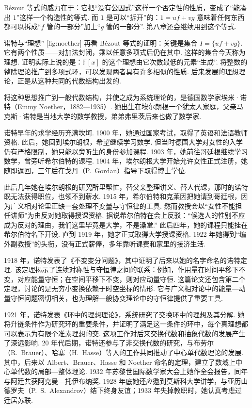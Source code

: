 \documentclass[lang=cn,10.5pt,scheme=chinese,toc=twocol,section,chinesefont=nofont,
twoside,citestyle=gb7714-2015,bibstyle=gb7714-2015]{elegantbook}
\DeclareRobustCommand{\textbf}[1]{{\lnsemiboldlatin\lnsemiboldcjk #1}}
\numberwithin{equation}{section}   %
\begin{document}
\begin{motivebox}
  Bézout 等式的威力在于：它把“没有公因式”这样一个\textbf{否定性}的性质，变成了“能凑出 $1$”这样一个\textbf{构造性}的等式. 而 $1$ 是可以“拆开”的：$1=uf+vg$ 意味着任何东西都可以拆成“$f$ 管的一部分”加上“$g$ 管的一部分”. 第八章还会继续用到这个等式.
\end{motivebox}
\begin{historybox}{诺特与“理想”}
  [fig:noether]
  再看 Bézout 等式的证明：关键是集合 $I=\{uf+vg\}$. 它有两个性质——对加法封闭，乘以任意多项式后仍在其中. 这样的集合今天称为\textbf{理想}. 证明实际上说的是：$\mathbb{F}[x]$ 的这个理想由它次数最低的元素“生成”. 将整数的整除理论推广到多项式环，可以发现两者具有许多相似的性质. 后来发展的理想理论，正是从这种共同的代数结构出发的.

  将这种思想推广到一般代数结构，并使之成为系统理论的，是德国数学家埃米·诺特（Emmy Noether，1882—1935）. 她出生在埃尔朗根一个犹太人家庭，父亲马克斯·诺特是当地大学的数学教授，弟弟弗里茨后来也做了数学家.

  诺特早年的求学经历充满坎坷. 1900 年，她通过国家考试，取得了英语和法语教师资格. 此后，她回到埃尔朗根，希望继续学习数学. 但当时德国大学对女性的入学仍有严格限制，她只能以旁听生的身份参加课程.  1903 年，她前往哥廷根继续学习数学，曾旁听希尔伯特的课程. 1904 年，埃尔朗根大学开始允许女性正式注册，她随即返回，三年后在戈丹（P.~Gordan）指导下取得博士学位\cite{dick1981noether}.

  此后几年她在埃尔朗根的研究所里帮忙，替父亲整理讲义、替人代课，那时的诺特既无法获得职位，也领不到薪水. 1915 年，希尔伯特和克莱因把她请到哥廷根，因为广义相对论里正缺一套处理不变量与守恒律的工具. 然而教授会以“女性不能担任讲师”为由反对她取得授课资格. 据说希尔伯特在会上反驳：“候选人的性别不应成为反对的理由，我们这里毕竟是大学，不是澡堂.” 此后四年，她的课程只能挂在希尔伯特名下开设. 直到 1919 年，她才正式取得大学授课资格\cite{reid1970hilbert}. 1922 年她得到“编外副教授”的头衔，没有正式薪俸，多年靠听课费和家里的接济生活.

  1918 年，诺特发表了《不变变分问题》，其中证明了后来以她的名字命名的\textbf{诺特定理}\cite{noether1918invariante}. 该定理揭示了连续对称性与守恒律之间的联系：例如，作用量在时间平移下不变，对应能量守恒；在空间平移下不变，则对应动量守恒. 这篇论文还包含第二个定理，讨论的是无穷小变换依赖于时空坐标的情形. 它与广义相对论中的能量—动量守恒问题密切相关，也为理解一般协变理论中的守恒律提供了重要工具.

  1921 年，诺特发表《环中的理想理论》，系统研究了交换环中的理想及其分解. 她将升链条件作为研究环的重要条件，并证明了满足这一条件的环中，每个真理想都可以表示为有限个准素理想的交\cite{noether1921idealtheorie}. 这项工作对后来交换代数和抽象代数的发展产生了深远影响.  20 年代后期，诺特还参与了非交换代数的研究，与布劳尔（R.~Brauer）、哈塞（H.~Hasse）等人的工作共同推动了中心单代数理论的发展. 其中，后来以 Albert、Brauer、Hasse 和 Noether 命名的定理，建立了数域上中心单代数的局部—整体理论. 1932 年苏黎世国际数学家大会上她作全会报告，同年与阿廷共获阿克曼—托伊布纳奖. 1928 年底她还应邀到莫斯科大学讲学，与亚历山德罗夫（P.~S.~Alexandrov）结下终身友谊；1933 年失掉教职时，她认真考虑过迁居苏联.


\end{historybox}
\end{document}

